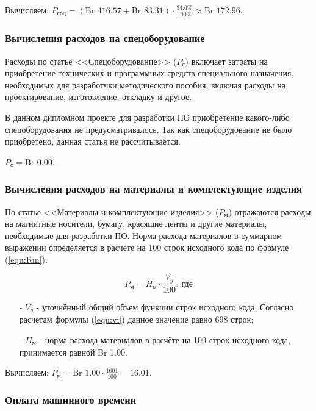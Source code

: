 Вычисляем: $P_\text{соц} = (\text{Br }416.57 + \text{Br }83.31) \cdot \frac{ 34.6\% }{ 100\% } \approx \text{Br }172.96$.

\subsubsection*{Вычисления расходов на спецоборудование}

Расходы по статье <<Спецоборудование>> ($P_\text{с}$) включает затраты на приобретение технических и программных средств специального назначения,
необходимых для разработчки методического пособия, включая расходы на проектирование, изготовление, откладку и другое.

В данном дипломном проекте для разработки ПО приобретение какого-либо спецоборудования не предусматривалось.
Так как спецоборудование не было приобретено, данная статья не рассчитывается.

$P_\text{с} = \text{Br }0.00$.

\subsubsection*{Вычисления расходов на материалы и комплектующие изделия}

По статье <<Материалы и комплектующие изделия>> ($P_\text{м}$) отражаются расходы на магнитные носители, бумагу, красящие ленты и другие материалы,
необходимые для разработки ПО.
Норма расхода материалов в суммарном выражении определяется в расчете на 100 строк исходного кода по формуле (\ref{equ:Rm}).

\begin{equation}
    \label{equ:Rm}
    P_\text{м} = H_\text{м} \cdot \frac{ V_y }{ 100 } \text{, где}
\end{equation}

\begin{enumerate}
    \item[-] $V_y$ - уточнённый общий объем функции строк исходного кода.
    Согласно расчетам формулы (\ref{equ:vi}) данное значение равно 698 строк;
    \item[-] $H_\text{м}$ - норма расхода материалов в расчёте на 100 строк исходного кода, принимается равной Br 1.00.
\end{enumerate}

Вычисляем: $P_\text{м} = \text{Br } 1.00 \cdot \frac{ 1601 }{ 100 } = 16.01$.

\subsubsection*{Оплата машинного времени}

